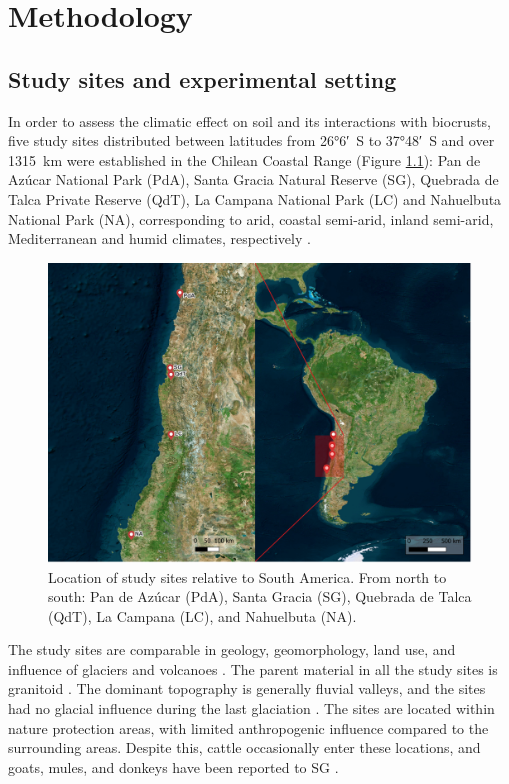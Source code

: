 \chapter{Methodology}

\section{Study sites and experimental setting}
\label{sec:StudysitesAndExperimentalSetting}

In order to assess the climatic effect on soil and its interactions with biocrusts, five study sites distributed between latitudes from \ang{26;6}~S to \ang{37;48}~S and over \SI{1315}{\kilo\meter} were established in the Chilean Coastal Range (Figure \ref{fig:location-map}): Pan de Azúcar National Park (PdA), Santa Gracia Natural Reserve (SG), Quebrada de Talca Private Reserve (QdT), La Campana National Park (LC) and Nahuelbuta National Park (NA), corresponding to arid, coastal semi-arid, inland semi-arid, Mediterranean and humid climates, respectively \citep{Bernhard2018}.

\begin{figure}[H]
	\centering
	\includegraphics[width=1\textwidth]{img/location-map.png}
	\caption[Location of study sites relative to South America]{Location of study sites relative to South America. From north to south: Pan de Azúcar (PdA), Santa Gracia (SG), Quebrada de Talca (QdT), La Campana (LC), and Nahuelbuta (NA).}
	\label{fig:location-map}
\end{figure}

The study sites are comparable in geology, geomorphology, land use, and influence of glaciers and volcanoes \citep{Bernhard2018}. The parent material in all the study sites is granitoid \citep{Bernhard2018}. The dominant topography is generally fluvial valleys, and the sites had no glacial influence during the last glaciation \citep{Hulton2002}. The sites are located within nature protection areas, with limited anthropogenic influence compared to the surrounding areas. Despite this, cattle occasionally enter these locations, and goats, mules, and donkeys have been reported to SG \citep{Armesto2007}.


